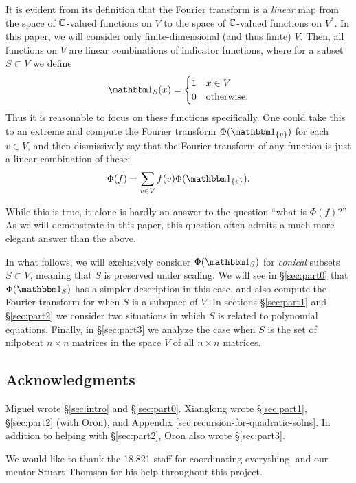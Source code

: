 It is evident from its definition that the Fourier transform is a \emph{linear} map from the space of $\mathbb{C}$-valued functions on $V$ to the space of $\mathbb{C}$-valued functions on $V^*$. In this paper, we will consider only finite-dimensional (and thus finite) $V$. Then, all functions on $V$ are linear combinations of indicator functions, where for a subset $S\subset V$ we define
\[ \IND_S(x) = \begin{cases}
1 & x \in V \\
0 & \text{otherwise.}     
\end{cases} \]
Thus it is reasonable to focus on these functions specifically. One could take this to an extreme and compute the Fourier transform $\Phi(\IND_{\{v\}})$ for each $v\in V$, and then dismissively say that the Fourier transform of any function is just a linear combination of these:
\[
	\Phi(f) = \sum_{v\in V} f(v)\Phi(\IND_{\{v\}}).
\]

While this is true, it alone is hardly an answer to the question ``what is $\Phi(f)$?'' As we will demonstrate in this paper, this question often admits a much more elegant answer than the above.

In what follows, we will exclusively consider $\Phi(\IND_S)$ for \emph{conical} subsets $S\subset V$, meaning that $S$ is preserved under scaling. We will see in \S\ref{sec:part0} that $\Phi(\IND_S)$ has a simpler description in this case, and also compute the Fourier transform for when $S$ is a subspace of $V$. In sections \S\ref{sec:part1} and \S\ref{sec:part2} we consider two situations in which $S$ is related to polynomial equations. Finally, in \S\ref{sec:part3} we analyze the case when $S$ is the set of nilpotent $n\times n$ matrices in the space $V$ of all $n\times n$ matrices.

\subsection*{Acknowledgments} Miguel wrote \S\ref{sec:intro} and \S\ref{sec:part0}. Xianglong wrote \S\ref{sec:part1}, \S\ref{sec:part2} (with Oron), and Appendix \ref{sec:recursion-for-quadratic-solns}. In addition to helping with \S\ref{sec:part2}, Oron also wrote \S\ref{sec:part3}.

We would like to thank the 18.821 staff for coordinating everything, and our mentor Stuart Thomson for his help throughout this project.